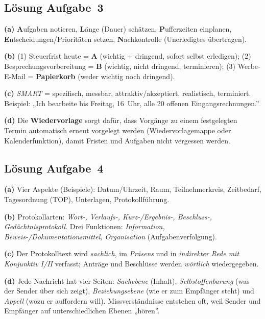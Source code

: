 \documentclass[11pt, a4paper]{article}
\begin{document}
\subsection*{Lösung Aufgabe~3}
\begin{loesung}
\textbf{(a)} \textbf{A}ufgaben notieren, \textbf{L}änge (Dauer) schätzen,
\textbf{P}ufferzeiten einplanen, \textbf{E}ntscheidungen/Prioritäten setzen,
\textbf{N}achkontrolle (Unerledigtes übertragen).

\textbf{(b)} (1) Steuerfrist heute = \textbf{A} (wichtig + dringend, sofort selbst
erledigen); (2) Besprechungsvorbereitung = \textbf{B} (wichtig, nicht dringend,
terminieren); (3) Werbe-E-Mail = \textbf{Papierkorb} (weder wichtig noch dringend).

\textbf{(c)} \emph{SMART} = spezifisch, messbar, attraktiv/akzeptiert, realistisch,
terminiert. Beispiel: „Ich bearbeite bis Freitag, 16~Uhr, alle 20 offenen
Eingangsrechnungen.''

\textbf{(d)} Die \textbf{Wiedervorlage} sorgt dafür, dass Vorgänge zu einem festgelegten
Termin automatisch erneut vorgelegt werden (Wiedervorlagemappe oder Kalenderfunktion),
damit Fristen und Aufgaben nicht vergessen werden.
\end{loesung}

\subsection*{Lösung Aufgabe~4}
\begin{loesung}
\textbf{(a)} Vier Aspekte (Beispiele): Datum/Uhrzeit, Raum, Teilnehmerkreis, Zeitbedarf,
Tagesordnung (TOP), Unterlagen, Protokollführung.

\textbf{(b)} Protokollarten: \emph{Wort-, Verlaufs-, Kurz-/Ergebnis-, Beschluss-,
Gedächtnisprotokoll}. Drei Funktionen: \emph{Information, Beweis-/Dokumentationsmittel,
Organisation} (Aufgabenverfolgung).

\textbf{(c)} Der Protokolltext wird \emph{sachlich}, im \emph{Präsens} und in
\emph{indirekter Rede mit Konjunktiv I/II} verfasst; Anträge und Beschlüsse werden
\emph{wörtlich} wiedergegeben.

\textbf{(d)} Jede Nachricht hat vier Seiten: \emph{Sachebene} (Inhalt),
\emph{Selbstoffenbarung} (was der Sender über sich zeigt), \emph{Beziehungsebene}
(wie er zum Empfänger steht) und \emph{Appell} (wozu er auffordern will). Missverständnisse
entstehen oft, weil Sender und Empfänger auf unterschiedlichen Ebenen „hören''.
\end{loesung}
\end{document}
